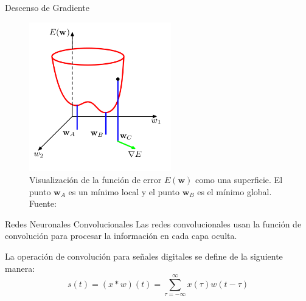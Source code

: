 \documentclass[10pt]{beamer}
\begin{document}
\begin{frame}{Descenso de Gradiente}
    \begin{figure}[!h] 
        \centering
        \includegraphics[width=0.55\textwidth]{../img/gradsup}
        \caption[Visualización de la función de error]{Visualización de la función de error $E(\mathbf{w})$ como una superficie. El punto $\mathbf{w}_A$ es un mínimo local y el punto $\mathbf{w}_B$ es el mínimo global. Fuente: \cite{Bishop2006} }
    \end{figure}
    
\end{frame}




\begin{frame}{Redes Neuronales Convolucionales}
    Las redes convolucionales usan la función de convolución para procesar 
    la información en cada capa oculta. 

    La operación de convolución para señales digitales se define de la siguiente manera:
    \begin{equation}
        s(t) = (x \ast w)(t) = \sum_{\tau=-\infty}^{\infty}x(\tau)w(t-\tau)
    \end{equation}

\end{frame}
\end{document}
